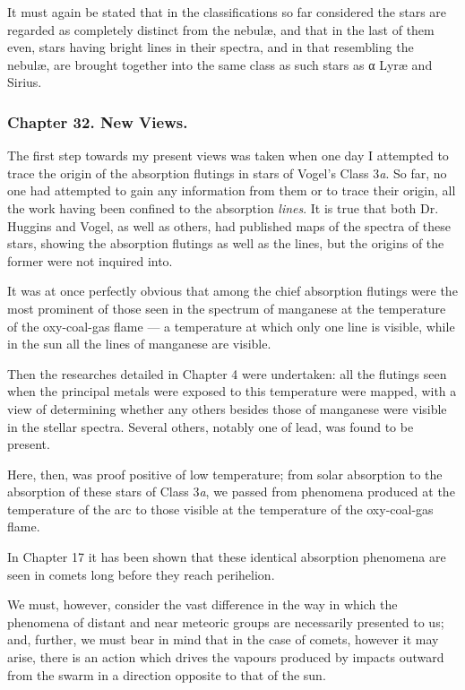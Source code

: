\documentclass[a4paper, 12pt, oneside, polutonikogreek, english]{article}
\begin{document}
It must again be stated that in the classifications so far considered the stars are regarded as completely distinct from the nebulæ, and that in the last of them even, stars having bright lines in their spectra, and in that resembling the nebulæ, are brought together into the same class as such stars as α Lyræ and Sirius.

\subsubsection{Chapter 32. New Views.}

The first step towards my present views was taken when one day I attempted to trace the origin of the absorption flutings in stars of Vogel's Class 3\emph{a}. So far, no one had attempted to gain any information from them or to trace their origin, all the work having been confined to the absorption \emph{lines}. It is true that both Dr. Huggins and Vogel, as well as others, had published maps of the spectra of these stars, showing the absorption flutings as well as the lines, but the origins of the former were not inquired into.

It was at once perfectly obvious that among the chief absorption flutings were the most prominent of those seen in the spectrum of manganese at the temperature of the oxy-coal-gas flame --- a temperature at which only one line is visible, while in the sun all the lines of manganese are visible.

Then the researches detailed in Chapter 4 were undertaken: all the flutings seen when the principal metals were exposed to this temperature were mapped, with a view of determining whether any others besides those of manganese were visible in the stellar spectra. Several others, notably one of lead, was found to be present.

Here, then, was proof positive of low temperature; from solar absorption to the absorption of these stars of Class 3\emph{a}, we passed from phenomena produced at the temperature of the arc to those visible at the temperature of the oxy-coal-gas flame.

In Chapter 17 it has been shown that these identical absorption phenomena are seen in comets long before they reach perihelion.

We must, however, consider the vast difference in the way in which the phenomena of distant and near meteoric groups are necessarily presented to us; and, further, we must bear in mind that in the case of comets, however it may arise, there is an action which drives the vapours produced by impacts outward from the swarm in a direction opposite to that of the sun.
\end{document}
